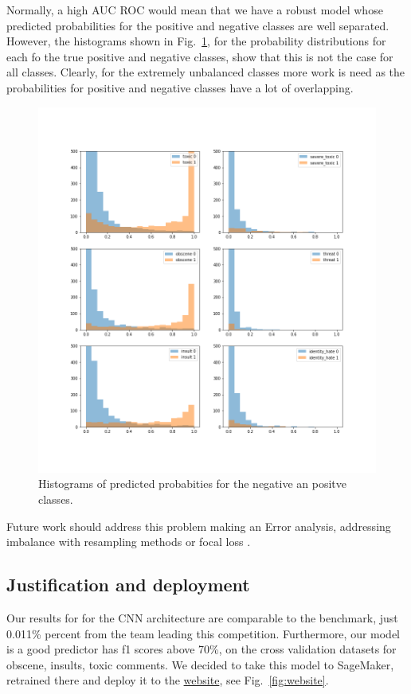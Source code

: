 \documentclass{report}
\begin{document}
Normally, a high AUC ROC would mean that we have a robust model 
whose predicted probabilities for the positive and negative classes 
are well separated. However, the histograms shown in  Fig.~\ref{fig:pdfs},  
for the probability distributions for each fo the true positive and negative classes, show that this is 
not the case for all classes. Clearly, 
for the extremely unbalanced classes more work is need as the probabilities 
for positive and negative classes have a lot of overlapping. 
\begin{figure}[!h]
\centering
  \includegraphics[width=160mm]{../local/plots_tables/pdfs.png}
  \caption{Histograms of predicted probabities for the negative an positve classes. }
  \label{fig:pdfs}
\end{figure}
Future work should address this problem making an Error analysis, addressing imbalance with 
resampling methods or focal loss \cite{focal}. 

\subsection{Justification and deployment}

Our results for for the CNN architecture are comparable to the benchmark, just 0.011\% percent
from the team leading this competition. Furthermore, our model is a good predictor 
has f1 scores above 70\%, on the cross validation datasets for obscene, insults, toxic comments. 
We decided to take this model to SageMaker, retrained there and deploy it to 
the \href{https://reneang17.github.io/The-speech-of-fake-news/}{website}, see Fig.~\ref{fig:website}. 
\end{document}
